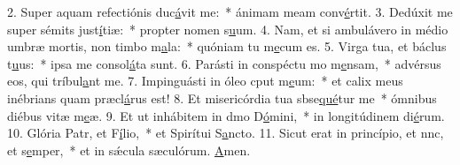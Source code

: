 2. Super aquam refectiónis duc\uline{á}vit me:~* ánimam meam conv\uline{é}rtit.
3. Dedúxit me super sémits just\uline{í}tiæ:~* propter nomen s\uline{u}um.
4. Nam, et si ambulávero in médio umbræ mortis, non timbo m\uline{a}la:~* quóniam tu m\uline{e}cum es.
5. Virga tua, et báclus t\uline{u}us:~* ipsa me consol\uline{á}ta sunt.
6. Parásti in conspéctu mo m\uline{e}nsam,~* advérsus eos, qui tríbul\uline{a}nt me.
7. Impinguásti in óleo cput m\uline{e}um:~* et calix meus inébrians quam præcl\uline{á}rus est!
8. Et misericórdia tua sbse\uline{qué}tur me~* ómnibus diébus vitæ m\uline{e}æ.
9. Et ut inhábitem in dmo D\uline{ó}mini,~* in longitúdinem di\uline{é}rum.
10. Glória Patr, et F\uline{í}lio,~* et Spirítui S\uline{a}ncto.
11. Sicut erat in princípio, et nnc, et s\uline{e}mper,~* et in sǽcula sæculórum. \uline{A}men.
